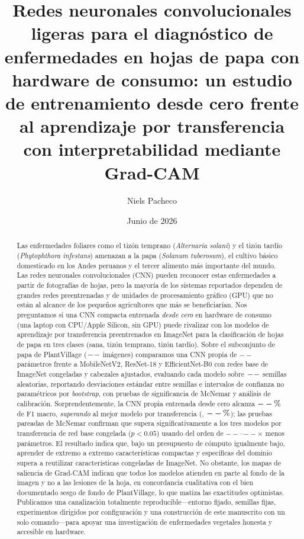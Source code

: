 \documentclass[10pt]{article}
\title{\vspace{-1.0cm}\bfseries Redes neuronales convolucionales ligeras para el
diagnóstico de enfermedades en hojas de papa con hardware de consumo: un estudio de
entrenamiento desde cero frente al aprendizaje por transferencia con interpretabilidad
mediante Grad-CAM}
\author[1]{Niels Pacheco}
\affil[1]{Programa de Maestría en Inteligencia Artificial, MIA-07 Redes Neuronales
y Aprendizaje Profundo (Sección C). \texttt{nielspacheco1997@gmail.com}}
\date{Junio de 2026}
\providecommand{\paramsCustom}{--}\providecommand{\trainparamsCustom}{--}
\providecommand{\paramratiomin}{--}\providecommand{\paramratiomax}{--}
\begin{document}
\maketitle

\begin{abstract}
\noindent
Las enfermedades foliares como el tizón temprano (\textit{Alternaria solani}) y el
tizón tardío (\textit{Phytophthora infestans}) amenazan a la papa
(\textit{Solanum tuberosum}), el cultivo básico domesticado en los Andes peruanos y
el tercer alimento más importante del mundo. Las redes neuronales convolucionales
(CNN) pueden reconocer estas enfermedades a partir de fotografías de hojas, pero la
mayoría de los sistemas reportados dependen de grandes redes preentrenadas y de
unidades de procesamiento gráfico (GPU) que no están al alcance de los pequeños
agricultores que más se beneficiarían. Nos preguntamos si una CNN compacta entrenada
\emph{desde cero} en hardware de consumo (una laptop con CPU/Apple Silicon, sin GPU)
puede rivalizar con los modelos de aprendizaje por transferencia preentrenados en
ImageNet para la clasificación de hojas de papa en tres clases (sana, tizón temprano,
tizón tardío). Sobre el subconjunto de papa de PlantVillage ($--$ imágenes)
comparamos una CNN propia de $\paramsCustom$ parámetros frente a MobileNetV2,
ResNet-18 y EfficientNet-B0 con redes base de ImageNet congeladas y cabezales
ajustados, evaluando cada modelo sobre $--$ semillas aleatorias, reportando
desviaciones estándar entre semillas e intervalos de confianza no paramétricos por
\emph{bootstrap}, con pruebas de significancia de McNemar y análisis de calibración.
Sorprendentemente, la CNN propia entrenada desde cero alcanza $--\%$ de F1
macro, \emph{superando} al mejor modelo por transferencia
(\besttransfer{}, $--\%$); las pruebas pareadas de McNemar confirman
que supera significativamente a los tres modelos por transferencia de red base
congelada ($p<0.05$) usando del orden de $\paramratiomin$--$\paramratiomax\times$
menos parámetros. El resultado indica que, bajo un presupuesto de cómputo igualmente
bajo, aprender de extremo a extremo características compactas y específicas del dominio
supera a reutilizar características congeladas de ImageNet. No obstante, los mapas de
saliencia de Grad-CAM indican que todos los modelos atienden en parte al fondo de la
imagen y no a las lesiones de la hoja, en concordancia cualitativa con el bien
documentado sesgo de fondo de PlantVillage, lo que matiza las exactitudes optimistas.
Publicamos una canalización totalmente reproducible---entorno fijado, semillas fijas,
experimentos dirigidos por configuración y una construcción de este manuscrito con un
solo comando---para apoyar una investigación de enfermedades vegetales honesta y
accesible en hardware.
\end{abstract}
\end{document}
